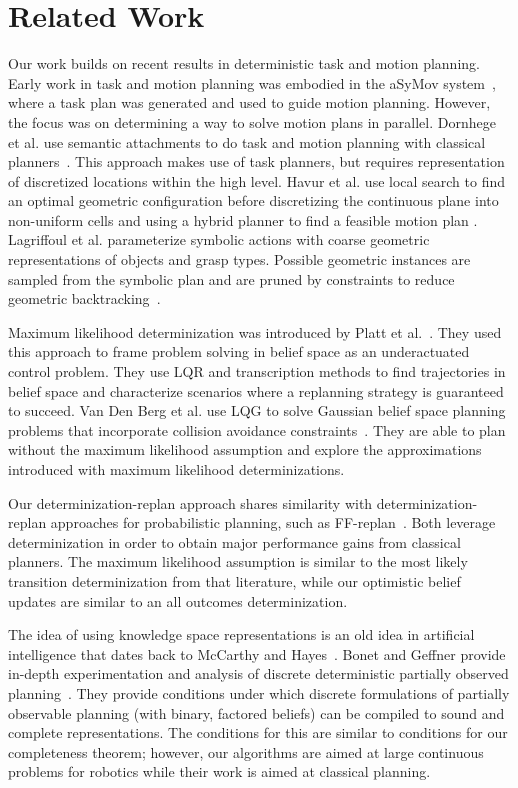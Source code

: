 \section{Related Work}
Our work builds on recent results in deterministic task and motion
planning. Early work in task and motion planning was embodied in the
aSyMov system~\cite{gravot2005asymov}, where a task plan was generated
and used to guide motion planning. However, the focus was on
determining a way to solve motion plans in parallel. Dornhege et
al. use semantic attachments to do task and motion planning with
classical planners~\cite{dornhege2012semantic}. This approach makes
use of task planners, but requires representation of discretized
locations within the high level. Havur et al. use local search to find an optimal geometric configuration before discretizing the continuous plane into non-uniform cells and using a hybrid planner to find a feasible motion plan \cite{havur2014geometric}. Lagriffoul et al. parameterize symbolic actions with coarse geometric representations of objects and grasp types. Possible geometric instances are sampled from the symbolic plan and are pruned by constraints to reduce geometric backtracking~\cite{lagriffoul2014orientation}.

Maximum likelihood determinization was introduced by Platt et
al.~\cite{platt2010belief}. They used this approach to frame problem
solving in belief space as an underactuated control problem. They use
LQR and transcription methods to find trajectories in belief space and
characterize scenarios where a replanning strategy is guaranteed to
succeed. Van Den Berg et al. use LQG to solve Gaussian belief space
planning problems that incorporate collision avoidance
constraints~\cite{van2012motion}. They are able to plan without
the maximum likelihood assumption and explore the approximations
introduced with maximum likelihood determinizations.

Our determinization-replan approach shares similarity with
determinization-replan approaches for probabilistic planning, such as
FF-replan~\cite{yoon2007ff}. Both leverage determinization in order to
obtain major performance gains from classical planners. The maximum
likelihood assumption is similar to the most likely transition
determinization from that literature, while our optimistic belief
updates are similar to an all outcomes determinization.

The idea of using knowledge space representations is an old idea in
artificial intelligence that dates back to McCarthy and
Hayes~\cite{mccarthy1968some}. Bonet and Geffner provide in-depth
experimentation and analysis of discrete deterministic partially
observed planning~\cite{bonet2011planning}.  They provide conditions
under which discrete formulations of partially observable planning
(with binary, factored beliefs) can be compiled to sound and complete
representations. The conditions for this are similar to conditions
for our completeness theorem; however, our algorithms are aimed at
large continuous problems for robotics while their work is aimed at
classical planning.


